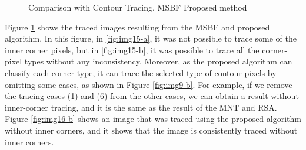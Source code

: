 \begin{figure}[htbp]
	\centering

	\caption{Comparison with Contour Tracing. \protect{} MSBF \protect{} Proposed method}
	\label{fig:image15}
\end{figure}


Figure \ref{fig:image15} shows the traced images resulting from the MSBF and proposed algorithm. In this figure, in \ref{fig:img15-a}, it was not possible to trace some of the inner corner pixels, but in \ref{fig:img15-b}, it was possible to trace all the corner-pixel types without any inconsistency. Moreover, as the proposed algorithm can classify each corner type, it can trace the selected type of contour pixels by omitting some cases, as shown in Figure \ref{fig:img9-b}. For example, if we remove the tracing cases (1) and (6) from the other cases, we can obtain a result without inner-corner tracing, and it is the same as the result of the MNT and RSA. Figure \ref{fig:img16-b} shows an image that was traced using the proposed algorithm without inner corners, and it shows that the image is consistently traced without inner corners.

